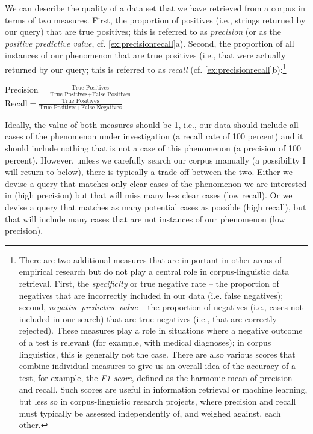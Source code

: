 We can describe the quality of a data set that we have retrieved from a corpus in terms of two measures. First, the proportion of positives (i.e., strings returned by our query) that are true positives; this is referred to as \textit{precision} (or as the \textit{positive predictive value}, cf. \ref{ex:precisionrecall}a). Second, the proportion of all instances of our phenomenon that are true positives (i.e., that were actually returned by our query; this is referred to as \textit{recall} (cf. \ref{ex:precisionrecall}b):\footnote{There are two additional measures that are important in other areas of empirical research but do not play a central role in corpus-linguistic data retrieval. First, the \emph{specificity} or true negative rate -- the proportion of negatives that are incorrectly included in our data (i.e. false negatives); second, \emph{negative predictive value} -- the proportion of negatives (i.e., cases not included in our search) that are true negatives (i.e., that are correctly rejected). These measures play a role in situations where a negative outcome of a test is relevant (for example, with medical diagnoses); in corpus linguistics, this is generally not the case. There are also various scores that combine individual measures to give us an overall idea of the accuracy of a test, for example, the \emph{F1 score}, defined as the harmonic mean of precision and recall. Such scores are useful in information retrieval or machine learning, but less so in corpus-linguistic research projects, where precision and recall must typically be assessed independently of, and weighed against, each other.}

\begin{exe}
\ex
\begin{xlist} 
\label{ex:precisionrecall}
\ex $\displaystyle{\text{Precision} = \frac{\text{True Positives}}{\text{True Positives} + \text{False Positives}}}$\\
\ex $\displaystyle{\text{Recall} = \frac{\text{True Positives}}{\text{True Positives} + \text{False Negatives}}}$
\end{xlist}
\end{exe}

Ideally, the value of both measures should be 1, i.e., our data should include all cases of the phenomenon under investigation (a recall rate of 100 percent) and it should include nothing that is not a case of this phenomenon (a precision of 100 percent). However, unless we carefully search our corpus manually (a possibility I will return to below), there is typically a trade-off between the two. Either we devise a query that matches only clear cases of the phenomenon we are interested in (high precision) but that will miss many less clear cases (low recall). Or we devise a query that matches as many potential cases as possible (high recall), but that will include many cases that are not instances of our phenomenon (low precision).

